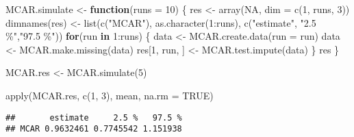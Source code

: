 \documentclass[
]{article}
\newenvironment{Shaded}{\begin{snugshade}}{\end{snugshade}}
\newcommand{\AttributeTok}[1]{\textcolor[rgb]{0.77,0.63,0.00}{#1}}
\newcommand{\ConstantTok}[1]{\textcolor[rgb]{0.00,0.00,0.00}{#1}}
\newcommand{\ControlFlowTok}[1]{\textcolor[rgb]{0.13,0.29,0.53}{\textbf{#1}}}
\newcommand{\DecValTok}[1]{\textcolor[rgb]{0.00,0.00,0.81}{#1}}
\newcommand{\FunctionTok}[1]{\textcolor[rgb]{0.00,0.00,0.00}{#1}}
\newcommand{\NormalTok}[1]{#1}
\newcommand{\OtherTok}[1]{\textcolor[rgb]{0.56,0.35,0.01}{#1}}
\newcommand{\SpecialCharTok}[1]{\textcolor[rgb]{0.00,0.00,0.00}{#1}}
\newcommand{\StringTok}[1]{\textcolor[rgb]{0.31,0.60,0.02}{#1}}
\begin{document}
\begin{Shaded}
\begin{Highlighting}[]
\NormalTok{MCAR.simulate }\OtherTok{\textless{}{-}} \ControlFlowTok{function}\NormalTok{(}\AttributeTok{runs =} \DecValTok{10}\NormalTok{) \{}
\NormalTok{  res }\OtherTok{\textless{}{-}} \FunctionTok{array}\NormalTok{(}\ConstantTok{NA}\NormalTok{, }\AttributeTok{dim =} \FunctionTok{c}\NormalTok{(}\DecValTok{1}\NormalTok{, runs, }\DecValTok{3}\NormalTok{))}
  \FunctionTok{dimnames}\NormalTok{(res) }\OtherTok{\textless{}{-}} \FunctionTok{list}\NormalTok{(}\FunctionTok{c}\NormalTok{(}\StringTok{"MCAR"}\NormalTok{),}
                        \FunctionTok{as.character}\NormalTok{(}\DecValTok{1}\SpecialCharTok{:}\NormalTok{runs),}
                        \FunctionTok{c}\NormalTok{(}\StringTok{"estimate"}\NormalTok{, }\StringTok{"2.5 \%"}\NormalTok{,}\StringTok{"97.5 \%"}\NormalTok{))}
  \ControlFlowTok{for}\NormalTok{(run }\ControlFlowTok{in} \DecValTok{1}\SpecialCharTok{:}\NormalTok{runs) \{}
\NormalTok{    data }\OtherTok{\textless{}{-}} \FunctionTok{MCAR.create.data}\NormalTok{(}\AttributeTok{run =}\NormalTok{ run)}
\NormalTok{    data }\OtherTok{\textless{}{-}} \FunctionTok{MCAR.make.missing}\NormalTok{(data)}
\NormalTok{    res[}\DecValTok{1}\NormalTok{, run, ] }\OtherTok{\textless{}{-}} \FunctionTok{MCAR.test.impute}\NormalTok{(data)}
\NormalTok{  \}}
\NormalTok{  res}
\NormalTok{\}}
\end{Highlighting}
\end{Shaded}

\begin{Shaded}
\begin{Highlighting}[]
\NormalTok{MCAR.res }\OtherTok{\textless{}{-}} \FunctionTok{MCAR.simulate}\NormalTok{(}\DecValTok{5}\NormalTok{)}
\end{Highlighting}
\end{Shaded}

\begin{Shaded}
\begin{Highlighting}[]
\FunctionTok{apply}\NormalTok{(MCAR.res, }\FunctionTok{c}\NormalTok{(}\DecValTok{1}\NormalTok{, }\DecValTok{3}\NormalTok{), mean, }\AttributeTok{na.rm =} \ConstantTok{TRUE}\NormalTok{)}
\end{Highlighting}
\end{Shaded}

\begin{verbatim}
##       estimate     2.5 %   97.5 %
## MCAR 0.9632461 0.7745542 1.151938
\end{verbatim}
\end{document}
